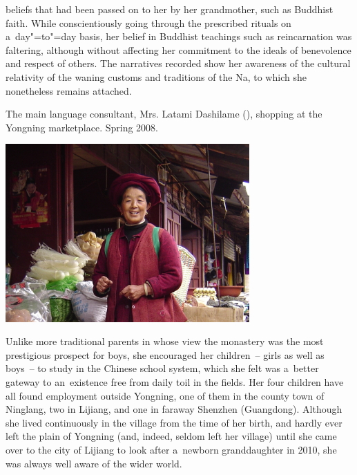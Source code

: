 beliefs that had been passed on to her by her grandmother, such as Buddhist
faith. While conscientiously going through the prescribed rituals on a~day"=to"=day basis, her belief in Buddhist teachings such as reincarnation was faltering, although without affecting her
commitment to the ideals of benevolence and respect of others. The narratives recorded show her
awareness of the cultural relativity of the waning customs and traditions of the Na, to which she
nonetheless remains attached.

\begin{photofigure}[t]
	\caption{The main language consultant, Mrs. Latami Dashilame (), shopping at the Yongning marketplace. Spring 2008.}
	\includegraphics[width=0.7\textwidth]{figures/Ama08355.jpg}
\end{photofigure}

Unlike more traditional parents in whose view the monastery was the most prestigious prospect for
boys, she encouraged her children~-- girls as well as boys~-- to study in the Chinese school system,
which she felt was a~better gateway to an~existence free from daily toil in the fields. Her four
children have all found employment outside Yongning, one of them in the county town of Ninglang, two
in Lijiang, and one in faraway Shenzhen (Guangdong). Although she lived continuously in the village
from the time of her birth, and hardly ever left the plain of Yongning (and, indeed, seldom left her village)
until she came over to the city of Lijiang to look after a~newborn granddaughter in 2010, she was
always well aware of the wider world.

